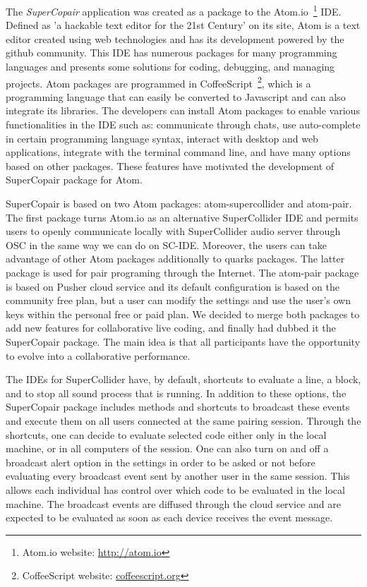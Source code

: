 The \textit{SuperCopair} application was created as a package to the Atom.io~\footnote{Atom.io website: \url{http://atom.io}} IDE.
Defined as 'a hackable text editor for the 21st Century' on its site, Atom is a text editor created using web technologies and has its development powered by the github community.
This IDE has numerous packages for many programming languages and presents some solutions for coding, debugging, and managing projects.
Atom packages are programmed in CoffeeScript~\footnote{CoffeeScript website: \url{coffeescript.org}}, which is a programming language that can easily be converted to Javascript and can also integrate its libraries.
The developers can install Atom packages to enable various functionalities in the IDE such as: communicate through chats, use auto-complete in certain programming language syntax, interact with desktop and web applications, integrate with the terminal command line, and have many options based on other packages.
These features have motivated the development of SuperCopair package for Atom.

SuperCopair is based on two Atom packages: atom-supercollider and atom-pair.
The first package turns Atom.io as an alternative SuperCollider IDE and permits users to openly communicate locally with SuperCollider audio server through OSC in the same way we can do on SC-IDE.
Moreover, the users can take advantage of other Atom packages additionally to quarks packages.
The latter package is used for pair programing through the Internet.
The atom-pair package is based on Pusher cloud service and its default configuration is based on the community free plan, but a user can modify the settings and use the user’s own keys within the personal free or paid plan. 
We decided to merge both packages to add new features for collaborative live coding, and finally had dubbed it the SuperCopair package.
The main idea is that all participants have the opportunity to evolve into a collaborative performance.

The IDEs for SuperCollider have, by default, shortcuts to evaluate a line, a block, and to stop all sound process that is running.
In addition to these options, the SuperCopair package includes methods and shortcuts to broadcast these events and execute them on all users connected at the same pairing session.
Through the shortcuts, one can decide to evaluate selected code either only in the local machine, or in all computers of the session.
One can also turn on and off a broadcast alert option in the settings in order to be asked or not before evaluating every broadcast event sent by another user in the same session. This allows each individual has control over which code to be evaluated in the local machine.
The broadcast events are diffused through the cloud service and are expected to be evaluated as soon as each device receives the event message.

